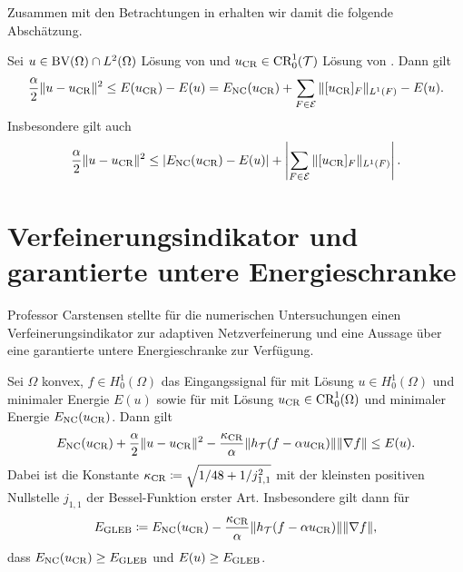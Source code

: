 Zusammen mit den Betrachtungen in  
erhalten wir damit die folgende Abschätzung.

\begin{corollary}
  Sei $u\in\textup{BV}(\Omega)\cap L^2(\Omega)$ Lösung von
   und $u_\textup{CR}\in\textup{CR}^1_0(\mathcal{T})$ Lösung von
  .
  Dann gilt
  \begin{align*}
    \frac{\alpha}{2}\Vert u-u_\textup{CR}\Vert^2\leq
    E(u_\textup{CR})-E(u)=E_\textup{NC}(u_\textup{CR})+\sum_{F\in\mathcal{E}}\Vert[u_\textup{CR}]_F\Vert_{L^1(F)}-E(u).
  \end{align*}
  Insbesondere gilt auch 
  \begin{align*}
    \frac{\alpha}{2}\Vert u-u_\textup{CR}\Vert^2
    \leq
    \left|E_\textup{NC}(u_\textup{CR})-E(u)\right|+
    \left|\sum_{F\in\mathcal{E}}\Vert[u_\textup{CR}]_F\Vert_{L^1(F)}\right|.
  \end{align*}
\end{corollary}

\section{Verfeinerungsindikator und garantierte untere Energieschranke}

Professor Carstensen stellte für die numerischen Untersuchungen 
einen Verfeinerungsindikator zur adaptiven Netzverfeinerung und eine 
Aussage über eine garantierte untere Energieschranke zur Verfügung.

\begin{theorem}
  \label{thm:gleb}
  Sei $\Omega$ konvex, $f\in H^1_0(\Omega)$ das Eingangssignal für
   mit Lösung $u\in H^1_0(\Omega)$ und minimaler
  Energie $E(u)$ sowie für  mit Lösung $u_\textup{CR}\in
  \textup{CR}^1_0(\Omega)$ und minimaler Energie $E_\textup{NC}(u_\textup{CR})$.
  Dann gilt
  \begin{align*}
    E_\textup{NC}(u_\textup{CR})+\frac{\alpha}{2}\Vert u-u_\textup{CR}\Vert^2
    -\frac{\kappa_{\textup{CR}}}{\alpha}\Vert
    h_{\mathcal{T}}(f-\alpha u_\textup{CR})\Vert \Vert\nabla f\Vert\leq E(u).
  \end{align*}
  Dabei ist die Konstante $\kappa_{\textup{CR}}\coloneqq\sqrt{1/48+1/j_{1,1}^2}$ mit der
  kleinsten positiven Nullstelle $j_{1,1}$ der Bessel-Funktion erster Art.
  Insbesondere gilt dann für 
  \begin{align}
    \label{eq:gleb}
    E_\textup{GLEB} 
    \coloneqq 
    E_\textup{NC}(u_\textup{CR}) - \frac{\kappa_{\textup{CR}}}{\alpha}\Vert h_{\mathcal{T}}(f-\alpha u_\textup{CR})\Vert
    \Vert \nabla f\Vert,
  \end{align}
    dass $E_\textup{NC}(u_\textup{CR})\geq E_\textup{GLEB}$ und $E(u)\geq E_\textup{GLEB}$.
\end{theorem}

